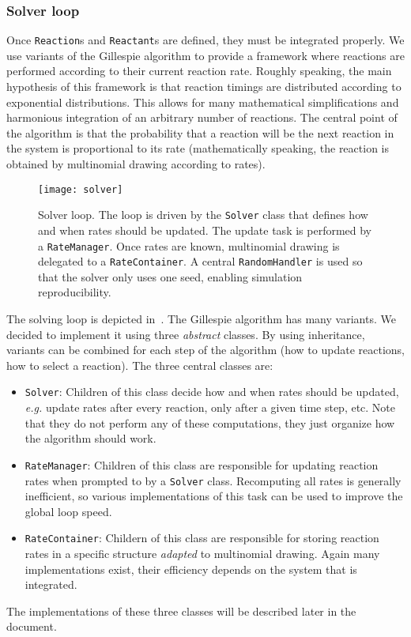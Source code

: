 
\subsubsection{Solver loop}

Once \texttt{Reaction}s and \texttt{Reactant}s are defined, they must be integrated properly. We use variants of the Gillespie algorithm to provide a framework where reactions are performed according to their current reaction rate. Roughly speaking, the main hypothesis of this framework is that reaction timings are distributed according to exponential distributions. This allows for many mathematical simplifications and harmonious integration of an arbitrary number of reactions. The central point of the algorithm is that the probability that a reaction will be the next reaction in the system is proportional to its rate (mathematically speaking, the reaction is obtained by multinomial drawing according to rates).

\begin{figure}[!h]
  \centering
  \texttt{[image: solver]}
  \caption{Solver loop. The loop is driven by the \texttt{Solver} class that defines how and when rates should be updated. The update task is performed by a \texttt{RateManager}. Once rates are known, multinomial drawing is delegated to a \texttt{RateContainer}. A central \texttt{RandomHandler} is used so that the solver only uses one seed, enabling simulation reproducibility.}
  \label{fig:solver}
\end{figure}

The solving loop is depicted in~. The Gillespie algorithm has many variants. We decided to implement it using three \emph{abstract} classes. By using inheritance, variants can be combined for each step of the algorithm (how to update reactions, how to select a reaction). The three central classes are:
\begin{itemize}
  \item \texttt{Solver}: Children of this class decide how and when rates should be updated, \textit{e.g.} update rates after every reaction, only after a given time step, etc. Note that they do not perform any of these computations, they just organize how the algorithm should work.
  \item \texttt{RateManager}: Children of this class are responsible for updating reaction rates when prompted to by a \texttt{Solver} class. Recomputing all rates is generally inefficient, so various implementations of this task can be used to improve the global loop speed.
  \item \texttt{RateContainer}: Childern of this class are responsible for storing reaction rates in a specific structure \emph{adapted} to multinomial drawing. Again many implementations exist, their efficiency depends on the system that is integrated.
\end{itemize}
The implementations of these three classes will be described later in the document.


